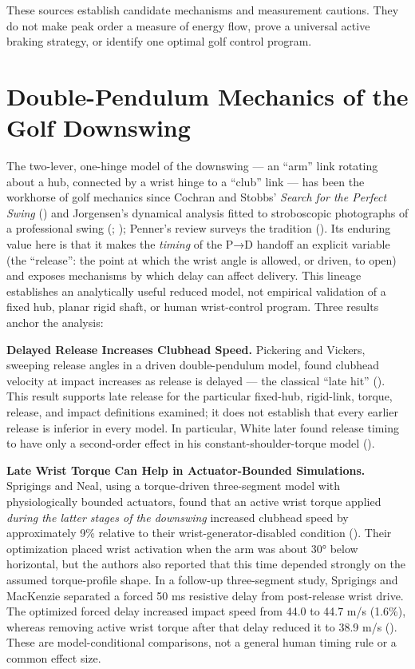 \documentclass[
  letterpaper,
]{report}
\begin{document}
These sources establish candidate mechanisms and measurement cautions.
They do not make peak order a measure of energy flow, prove a universal
active braking strategy, or identify one optimal golf control program.

\section{Double-Pendulum Mechanics of the Golf
Downswing}\label{sec-doublependulum}

The two-lever, one-hinge model of the downswing --- an ``arm'' link
rotating about a hub, connected by a wrist hinge to a ``club'' link ---
has been the workhorse of golf mechanics since Cochran and Stobbs'
\emph{Search for the Perfect Swing} () and Jorgensen's dynamical analysis fitted to
stroboscopic photographs of a professional swing
(;
); Penner's review
surveys the tradition (). Its
enduring value here is that it makes the \emph{timing} of the P→D
handoff an explicit variable (the ``release'': the point at which the
wrist angle is allowed, or driven, to open) and exposes mechanisms by
which delay can affect delivery. This lineage establishes an
analytically useful reduced model, not empirical validation of a fixed
hub, planar rigid shaft, or human wrist-control program. Three results
anchor the analysis:

\textbf{Delayed Release Increases Clubhead Speed.} Pickering and
Vickers, sweeping release angles in a driven double-pendulum model,
found clubhead velocity at impact increases as release is delayed ---
the classical ``late hit'' (). This result supports late release for the particular
fixed-hub, rigid-link, torque, release, and impact definitions examined;
it does not establish that every earlier release is inferior in every
model. In particular, White later found release timing to have only a
second-order effect in his constant-shoulder-torque model
().

\textbf{Late Wrist Torque Can Help in Actuator-Bounded Simulations.}
Sprigings and Neal, using a torque-driven three-segment model with
physiologically bounded actuators, found that an active wrist torque
applied \emph{during the latter stages of the downswing} increased
clubhead speed by approximately 9\% relative to their
wrist-generator-disabled condition
(). Their
optimization placed wrist activation when the arm was about 30° below
horizontal, but the authors also reported that this time depended
strongly on the assumed torque-profile shape. In a follow-up
three-segment study, Sprigings and MacKenzie separated a forced 50 ms
resistive delay from post-release wrist drive. The optimized forced
delay increased impact speed from 44.0 to 44.7 m/s (1.6\%), whereas
removing active wrist torque after that delay reduced it to 38.9 m/s
(). These are
model-conditional comparisons, not a general human timing rule or a
common effect size.
\end{document}
